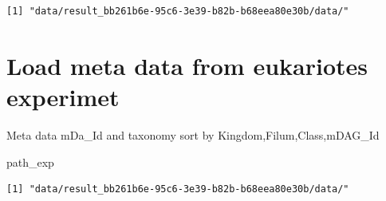 \documentclass[
  letterpaper,
  DIV=11,
  numbers=noendperiod]{scrreprt}
\newenvironment{Shaded}{}{}
\newcommand{\NormalTok}[1]{\textcolor[rgb]{0.67,0.70,0.75}{#1}}
\begin{document}
\begin{verbatim}
[1] "data/result_bb261b6e-95c6-3e39-b82b-b68eea80e30b/data/"
\end{verbatim}

\hypertarget{load-meta-data-from-eukariotes-experimet}{%
\section{Load meta data from eukariotes
experimet}\label{load-meta-data-from-eukariotes-experimet}}

Meta data mDa\_Id and taxonomy sort by Kingdom,Filum,Class,mDAG\_Id

\begin{Shaded}
\begin{Highlighting}[]
\NormalTok{path\_exp}
\end{Highlighting}
\end{Shaded}

\begin{verbatim}
[1] "data/result_bb261b6e-95c6-3e39-b82b-b68eea80e30b/data/"
\end{verbatim}
\end{document}
